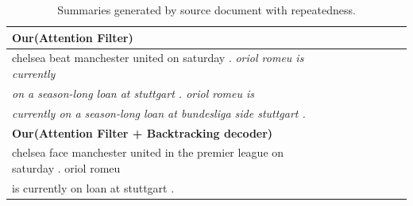 \begin{table}[th!]
\begin{center}
\scriptsize
\begin{tabular}{lclclclc}%
\hline \bf Our(Attention Filter)\\
\hline chelsea beat manchester united on saturday . \textit{oriol romeu is currently} \\
       \textit{on a season-long loan at stuttgart . oriol romeu is} \\
	   \textit{currently on a season-long loan at bundesliga side stuttgart .}\\
\hline \bf Our(Attention Filter + Backtracking decoder) \\
\hline chelsea face manchester united in the premier league on saturday . oriol romeu \\
       is currently on loan at stuttgart . \\
\hline
\end{tabular}
\end{center}
\caption{\label{tab:src_rep} Summaries generated by source document with repeatedness. }
\end{table}


